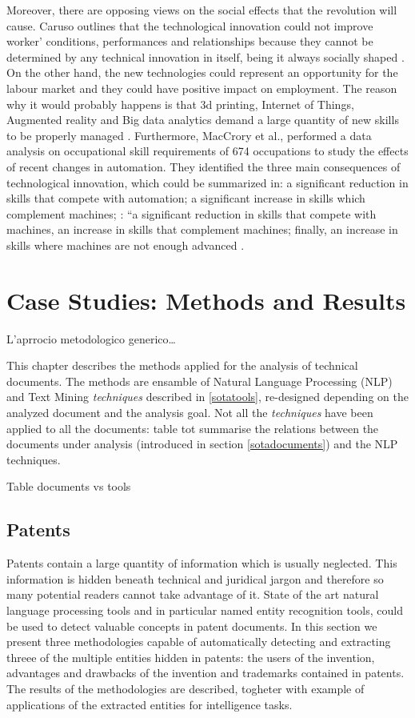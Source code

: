 \documentclass[]{book}
\begin{document}
Moreover, there are opposing views on the social effects that the
revolution will cause. Caruso outlines that the technological innovation
could not improve worker' conditions, performances and relationships
because they cannot be determined by any technical innovation in itself,
being it always socially shaped \citep{caruso2017digital}. On the other
hand, the new technologies could represent an opportunity for the labour
market and they could have positive impact on employment. The reason why
it would probably happens is that 3d printing, Internet of Things,
Augmented reality and Big data analytics demand a large quantity of new
skills to be properly managed \citep{freddi2017digitalisation}.
Furthermore, MacCrory et al., performed a data analysis on occupational
skill requirements of 674 occupations to study the effects of recent
changes in automation. They identified the three main consequences of
technological innovation, which could be summarized in: a significant
reduction in skills that compete with automation; a significant increase
in skills which complement machines; : ``a significant reduction in
skills that compete with machines, an increase in skills that complement
machines; finally, an increase in skills where machines are not enough
advanced \citep{maccrory2014racing}.

\chapter{Case Studies: Methods and Results}\label{methods}

L'aprrocio metodologico generico\ldots{}

This chapter describes the methods applied for the analysis of technical
documents. The methods are ensamble of Natural Language Processing (NLP)
and Text Mining \emph{techniques} described in \ref{sotatools},
re-designed depending on the analyzed document and the analysis goal.
Not all the \emph{techniques} have been applied to all the documents:
table tot summarise the relations between the documents under analysis
(introduced in section \ref{sotadocuments}) and the NLP techniques.

Table documents vs tools

\section{Patents}\label{patents}

Patents contain a large quantity of information which is usually
neglected. This information is hidden beneath technical and juridical
jargon and therefore so many potential readers cannot take advantage of
it. State of the art natural language processing tools and in particular
named entity recognition tools, could be used to detect valuable
concepts in patent documents. In this section we present three
methodologies capable of automatically detecting and extracting threee
of the multiple entities hidden in patents: the users of the invention,
advantages and drawbacks of the invention and trademarks contained in
patents. The results of the methodologies are described, togheter with
example of applications of the extracted entities for intelligence
tasks.
\end{document}
